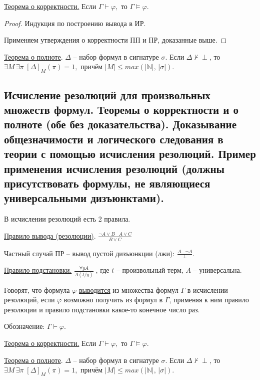\documentclass[a4paper, fleqn]{article}
\begin{document}
    \underline{Теорема о корректности.} Если $\Gamma \vdash \varphi,$ то $\Gamma \vDash \varphi.$

    \begin{proof} Индукция по построению вывода в ИР.

    Применяем утверждения о корректности ПП и ПР, доказанные выше.
    \end{proof}

    \underline{Теорема о полноте}. $\Delta$ -- набор формул в сигнатуре $\sigma$. Если $\Delta \nvdash \perp$, то $\exists M \, \exists \pi \; [\Delta]_M (\pi) = 1,$ причём $|M| \leq max(|\mathbb{N}|, \, | \sigma|). $


    \subsection{Исчисление резолюций для произвольных множеств формул. Теоремы о корректности и о полноте (обе без доказательства). Доказывание общезначимости и логического следования в теории с помощью исчисления резолюций. Пример применения исчисления резолюций (должны присутствовать формулы, не являющиеся универсальными дизъюнктами).}
    
    В исчислении резолюций есть 2 правила.
    
    \underline{Правило вывода (резолюции)}. $\boxed{\frac{\neg A \lor B \; \; \; A \lor C}{B \lor C} } $
    
    Частный случай ПР -- вывод пустой дизъюнкции (лжи): $\frac{A \; \; \; \neg A}{\perp}.$
    
    \underline{Правило подстановки.} $\boxed{\frac{\forall y A}{A(t/y)}} \; $, где $t$ -- произвольный терм, $A$ -- универсальна.
    
    Говорят, что формула $\varphi$ \underline{выводится} из множества  формул $\Gamma$ в исчислении резолюций, если $\varphi$ возможно получить из формул в $\Gamma$, применяя к ним правило резолюции и правило подстановки какое-то конечное число раз.
    
    Обозначение: $\Gamma \vdash \varphi.$
    
    \underline{Теорема о корректности.} Если $\Gamma \vdash \varphi,$ то $\Gamma \vDash \varphi.$
    
    \underline{Теорема о полноте}. $\Delta$ -- набор формул в сигнатуре $\sigma$. Если $\Delta \nvdash \perp$, то $\exists M \, \exists \pi \; [\Delta]_M (\pi) = 1,$ причём $|M| \leq max(|\mathbb{N}|, \, | \sigma|). $
    
\end{document}
